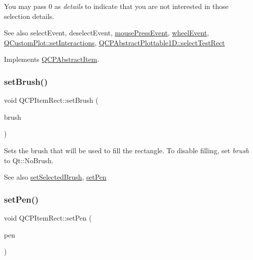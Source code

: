 You may pass 0 as {\itshape details} to indicate that you are not interested in those selection details.

\begin{DoxySeeAlso}{See also}
select\+Event, deselect\+Event, \hyperlink{classQCPLayerable_af6567604818db90f4fd52822f8bc8376}{mouse\+Press\+Event}, \hyperlink{classQCPLayerable_a47dfd7b8fd99c08ca54e09c362b6f022}{wheel\+Event}, \hyperlink{classQCustomPlot_a5ee1e2f6ae27419deca53e75907c27e5}{Q\+Custom\+Plot\+::set\+Interactions}, \hyperlink{classQCPAbstractPlottable1D_a22377bf6e57ab7eedbc9e489250c6ded}{Q\+C\+P\+Abstract\+Plottable1\+D\+::select\+Test\+Rect} 
\end{DoxySeeAlso}


Implements \hyperlink{classQCPAbstractItem_ae41d0349d68bb802c49104afd100ba2a}{Q\+C\+P\+Abstract\+Item}.

\mbox{\label{classQCPItemRect_abbd4e346a03513ee466afc25d9c75446}} 
\subsubsection{\texorpdfstring{set\+Brush()}{setBrush()}}
{\footnotesize\ttfamily void Q\+C\+P\+Item\+Rect\+::set\+Brush (\begin{DoxyParamCaption}\item[{const Q\+Brush \&}]{brush }\end{DoxyParamCaption})}

Sets the brush that will be used to fill the rectangle. To disable filling, set {\itshape brush} to Qt\+::\+No\+Brush.

\begin{DoxySeeAlso}{See also}
\hyperlink{classQCPItemRect_abd1792859844118dedee86223cede7af}{set\+Selected\+Brush}, \hyperlink{classQCPItemRect_a483c0da5a17e1646cd17ddea2c124e7d}{set\+Pen} 
\end{DoxySeeAlso}
\mbox{\label{classQCPItemRect_a483c0da5a17e1646cd17ddea2c124e7d}} 
\subsubsection{\texorpdfstring{set\+Pen()}{setPen()}}
{\footnotesize\ttfamily void Q\+C\+P\+Item\+Rect\+::set\+Pen (\begin{DoxyParamCaption}\item[{const Q\+Pen \&}]{pen }\end{DoxyParamCaption})}

